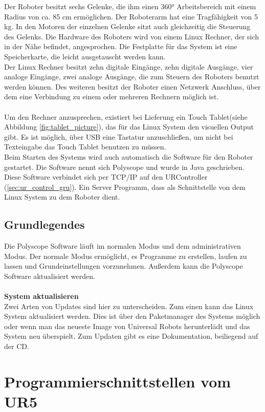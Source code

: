 Der Roboter besitzt sechs Gelenke, die ihm einen 360° Arbeitsbereich mit einem Radius von ca. 85 cm ermöglichen. Der Roboterarm hat eine Tragfähigkeit von 5 kg. In den Motoren der einzelnen Gelenke sitzt auch gleichzeitig die Steuerung des Gelenks. Die Hardware des Roboters wird von einem Linux Rechner, der sich in der Nähe befindet, angesprochen.
Die Festplatte für das System ist eine Speicherkarte, die leicht ausgetauscht werden kann.\\
Der Linux Rechner besitzt zehn digitale Eingänge, zehn digitale Ausgänge, vier analoge Eingänge, zwei analoge Ausgänge, die zum Steuern des Roboters benutzt werden können. Des weiteren besitzt der Roboter einen Netzwerk Anschluss, über dem eine Verbindung zu einem oder mehreren Rechnern möglich ist.
\\\\
Um den Rechner anzusprechen, existiert bei Lieferung ein Touch Tablet(siehe Abbildung \ref{fig:tablet_picture}), das für das Linux System den visuellen Output gibt. Es ist möglich, über USB eine Tastatur anzuschließen, um nicht bei Texteingabe das Touch Tablet benutzen zu müssen.
\\
Beim Starten des Systems wird auch automatisch die Software für den Roboter gestartet. Die Software nennt sich Polyscope und wurde in Java geschrieben. Diese Software verbindet sich per \ac{TCP/IP} auf den URController (\ref{sec:ur_control_gru}). Ein Server Programm, dass als Schnittstelle von dem Linux System zu dem Roboter dient.

\subsection{Grundlegendes}
\label{sub:ur_update_gru}

Die Polyscope Software läuft im normalen Modus und dem administrativen Modus. Der normale Modus ermöglicht, es Programme zu erstellen, laufen zu lassen und Grundeinstellungen vorzunehmen. Außerdem kann die Polyscope Software aktualisiert werden.
\\\\
\textbf{System aktualisieren}\\
Zwei Arten von Updates sind hier zu unterscheiden. Zum einen kann das Linux System aktualisiert werden. Dies ist über den Paketmanager des Systems möglich oder wenn man das neueste Image von Universal Robots herunterlädt und das System neu überspielt. Zum Updaten gibt es eine Dokumentation, beiliegend auf der CD.

\section{Programmierschnittstellen vom UR5}
\label{sec:programm_api_uebersicht_gru}

